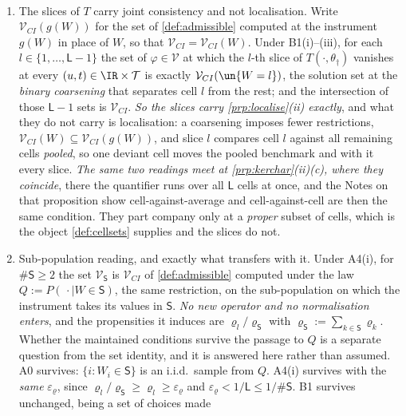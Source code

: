 \begin{remark}\label{rem:localise}~
\begin{enumerate}
\item[(1)] The slices of $T$ carry joint consistency and not localisation. Write
$\mathcal V_{CI}(g(W))$ for the set of \cref{def:admissible} computed at the instrument $g(W)$ in place of
$W$, so that $\mathcal V_{CI}=\mathcal V_{CI}(W)$. Under B1(i)--(iii), for each
$l\in\{1,\dots,\mathsf L-1\}$ the set of $\varphi\in\mathcal V$ at which the $l$-th slice of
$T(\cdot,\theta_\dagger)$ vanishes at every $(u,t)\in\IR\times\mathcal T$ is exactly
$\mathcal V_{CI}(\un\{W=l\})$, the solution set at the \emph{binary coarsening} that separates cell $l$
from the rest; and the intersection of those $\mathsf L-1$ sets is $\mathcal V_{CI}$. \emph{So the slices
carry \cref{prp:localise}\textup{(ii)} exactly}, and what they do not carry is localisation: a coarsening
imposes fewer restrictions, $\mathcal V_{CI}(W)\subseteq\mathcal V_{CI}(g(W))$, and slice $l$ compares
cell $l$ against all remaining cells \emph{pooled}, so one deviant cell moves the pooled benchmark and
with it every slice. \emph{The same two readings meet at \cref{prp:kerchar}\textup{(ii)}\textup{(c)},
where they coincide}, there the quantifier runs over all $\mathsf L$ cells at once, and the Notes on
that proposition show cell-against-average and cell-against-cell are then the same condition. They part
company only at a \emph{proper} subset of cells, which is the object \cref{def:cellsets} supplies and the
slices do not.
\item[(2)] Sub-population reading, and exactly what transfers with it. Under A4(i), for
$\#\mathsf S\ge2$ the set $\mathcal V_{\mathsf S}$ is $\mathcal V_{CI}$ of \cref{def:admissible} computed
under the law $Q:=P(\,\cdot\mid W\in\mathsf S)$, the same restriction, on the sub-population on which
the instrument takes its values in $\mathsf S$. \emph{No new operator and no normalisation enters}, and
the propensities it induces are $\varrho_l/\varrho_{\mathsf S}$ with
$\varrho_{\mathsf S}:=\sum_{k\in\mathsf S}\varrho_k$. Whether the maintained conditions survive the
passage to $Q$ is a separate question from the set identity, and it is answered here rather than
assumed. A0 survives: $\{i:W_i\in\mathsf S\}$ is an i.i.d.\ sample from $Q$. A4(i) survives with the
\emph{same} $\varepsilon_\varrho$, since $\varrho_l/\varrho_{\mathsf S}\ge\varrho_l\ge\varepsilon_\varrho$
and $\varepsilon_\varrho<1/\mathsf L\le1/\#\mathsf S$. B1 survives unchanged, being a set of choices made

\end{enumerate}
\end{remark}
